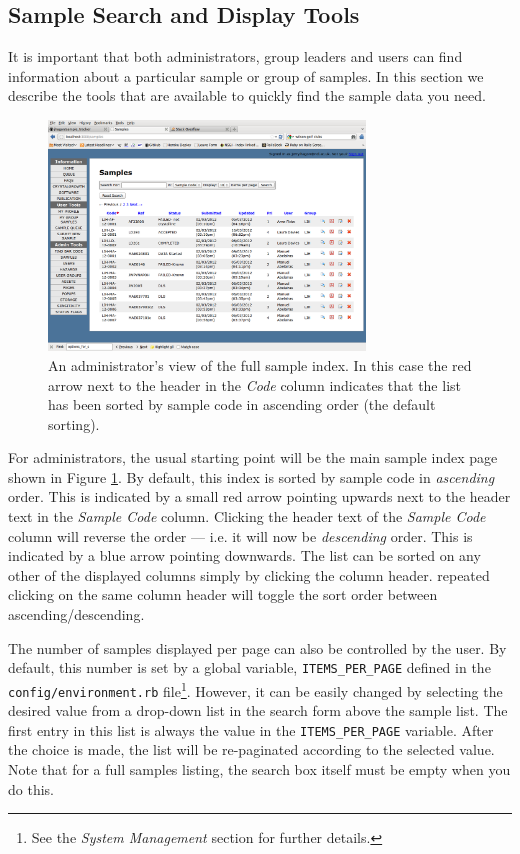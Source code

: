 \documentclass[12pt,twoside]{article}
\begin{document}
\subsection{Sample Search and Display Tools}
It is important that both administrators, group leaders and users can
find information about a particular sample or group of samples.
In this section we describe the tools that are available to quickly find
the sample data you need.

\begin{figure}[!htb]
\begin{center}
\includegraphics[width=0.75\textwidth]{sampleindex}
\caption{An administrator's view of the full sample index. 
In this case the red arrow next to the header in the \emph{Code}
column indicates that the list has been sorted by sample code in
ascending order (the default sorting).\label{fig:sampleindex}}
\end{center}
\end{figure}

For administrators, the usual starting point will be the main sample
index page shown in Figure \ref{fig:sampleindex}.
By default, this index is sorted by sample code in \emph{ascending} order.
This is indicated by a small red arrow pointing upwards next to the header
text in the \emph{Sample Code} column. 
Clicking the header text of the \emph{Sample Code} column will reverse the
order --- i.e. it will now be \emph{descending} order. This is indicated
by a blue arrow pointing downwards.
The list can be sorted on any other of the displayed columns simply by
clicking the column header. repeated clicking on the same column header
will toggle the sort order between ascending/descending.

The number of samples displayed per page can also be controlled by the
user. By default, this number is set by a global variable,
\verb=ITEMS_PER_PAGE= defined in the \verb=config/environment.rb= file\footnote{See the \emph{System Management} section for further details.}.
However, it can be easily changed by selecting the desired value from
a drop-down list in the search form above the sample list.
The first entry in this list is always the value in the
\verb=ITEMS_PER_PAGE= variable.
After the choice is made, the list will be re-paginated according to
the selected value. Note that for a full samples listing, the search box
itself must be empty when you do this.
\end{document}
